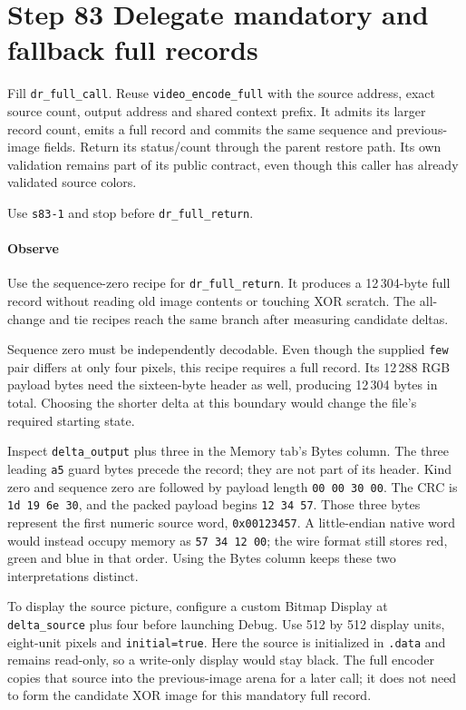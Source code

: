 \section{Step 83 Delegate mandatory and fallback full records}
Fill \texttt{dr\_full\_call}. Reuse \texttt{video\_encode\_full} with the source address, exact source count, output address and shared context prefix. It admits its larger record count, emits a full record and commits the same sequence and previous-image fields. Return its status/count through the parent restore path. Its own validation remains part of its public contract, even though this caller has already validated source colors.

Use \texttt{s83-1} and stop before \texttt{dr\_full\_return}.

\paragraph{Observe} Use the sequence-zero recipe for \texttt{dr\_full\_return}. It produces a 12\,304-byte full record without reading old image contents or touching XOR scratch. The all-change and tie recipes reach the same branch after measuring candidate deltas.

Sequence zero must be independently decodable. Even though the supplied
\texttt{few} pair differs at only four pixels, this recipe requires a full record.
Its 12\,288 RGB payload bytes need the sixteen-byte header as well, producing
12\,304 bytes in total. Choosing the shorter delta at this boundary would change
the file's required starting state.

Inspect \texttt{delta\_output} plus three in the Memory tab's Bytes column.
The three leading \texttt{a5} guard bytes precede the record; they are not part of
its header. Kind zero and sequence zero are followed by payload length
\texttt{00 00 30 00}. The CRC is \texttt{1d 19 6e 30}, and the packed payload begins
\texttt{12 34 57}. Those three bytes represent the first numeric source word,
\texttt{0x00123457}. A little-endian native word would instead occupy memory as
\texttt{57 34 12 00}; the wire format still stores red, green and blue in that order.
Using the Bytes column keeps these two interpretations distinct.

To display the source picture, configure a custom Bitmap Display at
\texttt{delta\_source} plus four before launching Debug. Use 512 by 512 display
units, eight-unit pixels and \texttt{initial=true}. Here the source is initialized
in \texttt{.data} and remains read-only, so a write-only display would stay black.
The full encoder copies that source into the previous-image arena for a later call;
it does not need to form the candidate XOR image for this mandatory full record.

